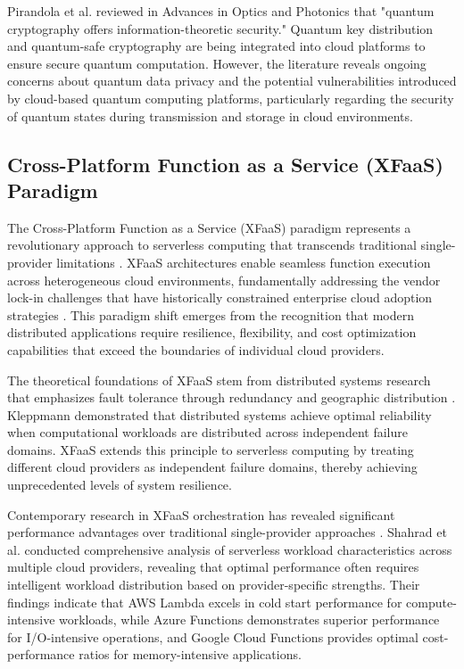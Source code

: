 \documentclass[onecolumn]{IEEEtran}
\begin{document}
Pirandola et al. \cite{quantum_security} reviewed in Advances in Optics and Photonics that "quantum cryptography offers information-theoretic security." Quantum key distribution and quantum-safe cryptography are being integrated into cloud platforms to ensure secure quantum computation. However, the literature reveals ongoing concerns about quantum data privacy and the potential vulnerabilities introduced by cloud-based quantum computing platforms, particularly regarding the security of quantum states during transmission and storage in cloud environments.

\subsection{Cross-Platform Function as a Service (XFaaS) Paradigm}

The Cross-Platform Function as a Service (XFaaS) paradigm represents a revolutionary approach to serverless computing that transcends traditional single-provider limitations \cite{castro2019serverless}. XFaaS architectures enable seamless function execution across heterogeneous cloud environments, fundamentally addressing the vendor lock-in challenges that have historically constrained enterprise cloud adoption strategies \cite{hellerstein2018serverless}. This paradigm shift emerges from the recognition that modern distributed applications require resilience, flexibility, and cost optimization capabilities that exceed the boundaries of individual cloud providers.

The theoretical foundations of XFaaS stem from distributed systems research that emphasizes fault tolerance through redundancy and geographic distribution \cite{van2017distributed}. Kleppmann \cite{kleppmann2017designing} demonstrated that distributed systems achieve optimal reliability when computational workloads are distributed across independent failure domains. XFaaS extends this principle to serverless computing by treating different cloud providers as independent failure domains, thereby achieving unprecedented levels of system resilience.

Contemporary research in XFaaS orchestration has revealed significant performance advantages over traditional single-provider approaches \cite{wang2018peeking}. Shahrad et al. \cite{shahrad2020serverless} conducted comprehensive analysis of serverless workload characteristics across multiple cloud providers, revealing that optimal performance often requires intelligent workload distribution based on provider-specific strengths. Their findings indicate that AWS Lambda excels in cold start performance for compute-intensive workloads, while Azure Functions demonstrates superior performance for I/O-intensive operations, and Google Cloud Functions provides optimal cost-performance ratios for memory-intensive applications.
\end{document}
